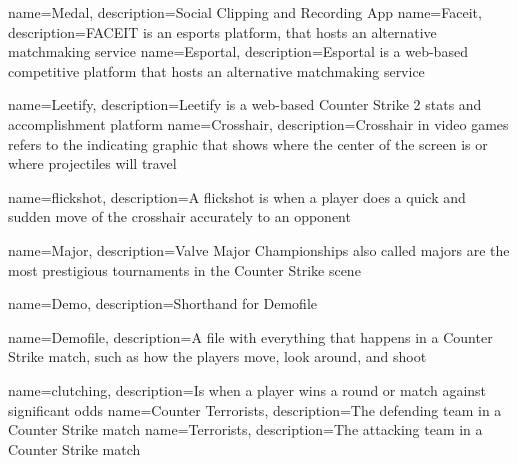 {
    name=Medal,
    description={Social Clipping and Recording App}
}
{
    name=Faceit,
    description={FACEIT is an esports platform, that hosts an alternative matchmaking service}
}
{
    name=Esportal,
    description={Esportal is a web-based competitive platform that hosts an alternative matchmaking service }
}


{
    name=Leetify,
    description={Leetify is a web-based Counter Strike 2 stats and accomplishment platform}
}
{
    name=Crosshair,
    description={Crosshair in video games refers to the indicating graphic that shows where the center of the screen is or where projectiles will travel}
}

{
    name=flickshot,
    description={A flickshot is when a player does a quick and sudden move of the crosshair accurately to an opponent}
}

{
    name=Major,
    description={Valve Major Championships also called majors are the most prestigious tournaments in the Counter Strike scene}
}

{
    name=Demo,
    description={Shorthand for \Gls{Demofile}}
}

{
    name=Demofile,
    description={A file with everything that happens in a Counter Strike match, such as how the players move, look around, and shoot}
}


{
    name=clutching,
    description={Is when a player wins a round or match against significant odds}
}
{
    name=Counter Terrorists,
    description={The defending team in a Counter Strike match}
}
{
    name=Terrorists,
    description={The attacking team in a Counter Strike match}
}

